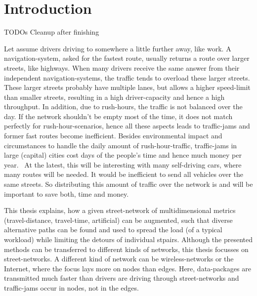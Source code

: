 \chapter{Introduction}
\label{chap:introduction}

TODOs Cleanup after finishing

Let assume drivers driving to somewhere a little further away, like work.
A navigation-system, asked for the fastest route, usually returns a route over larger streets, like highways.
When many drivers receive the same answer from their independent navigation-systems, the traffic tends to overload these larger streets.
These larger streets probably have multiple lanes, but allows a higher speed-limit than smaller streets, resulting in a high driver-capacity and hence a high throughput.
In addition, due to rush-hours, the traffic is not balanced over the day.
If the network shouldn't be empty most of the time, it does not match perfectly for rush-hour-scenarios, hence all these aspects leads to traffic-jams and former fast routes become inefficient.
Besides environmental impact and circumstances to handle the daily amount of rush-hour-traffic, traffic-jams in large (capital) cities cost days of the people's time and hence much money per year.~\cite{inrix:traffic-cost}
At the latest, this will be interesting with many self-driving cars, where many routes will be needed.
It would be inefficient to send all vehicles over the same streets.
So distributing this amount of traffic over the network is and will be important to save both, time and money.

This thesis explains, how a given street-network of multidimensional metrics (travel-distance, travel-time, artificial) can be augmented, such that diverse alternative paths can be found and used to spread the load (of a typical workload) while limiting the detours of individual \glspl{stpair}.
Although the presented methods can be transferred to different kinds of networks, this thesis focusses on street-networks.
A different kind of network can be wireless-networks or the Internet, where the focus lays more on nodes than edges.
Here, data-packages are transmitted much faster than drivers are driving through street-networks and traffic-jams occur in nodes, not in the edges.

